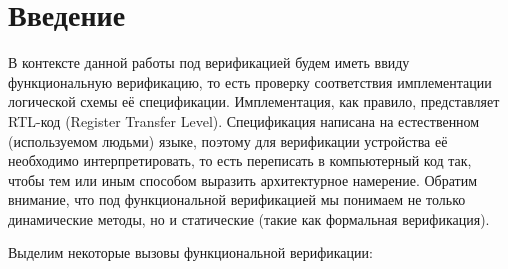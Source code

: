 \section{Введение}

\tab В контексте данной работы под верификацией будем иметь ввиду функциональную верификацию, то есть проверку соответствия имплементации логической схемы её спецификации. Имплементация, как правило, представляет RTL-код (Register Transfer Level). Спецификация написана на естественном (используемом людьми) языке, поэтому для верификации устройства её необходимо интерпретировать, то есть переписать в компьютерный код так, чтобы тем или иным способом выразить архитектурное намерение. Обратим внимание, что под функциональной верификацией мы понимаем не только динамические методы, но и статические (такие как формальная верификация).

Выделим некоторые вызовы функциональной верификации:

